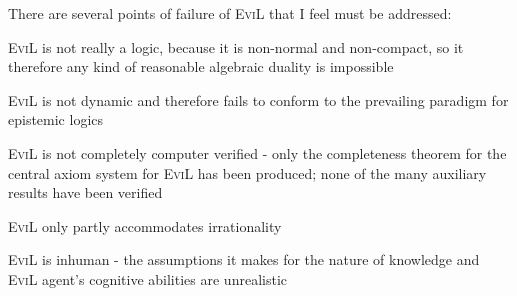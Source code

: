 There are several points of failure of \textsc{EviL} that I feel must be
addressed:
\begin{myRoman}
  \item \textsc{EviL} is not really a logic, because it is non-normal
    and non-compact, so it therefore any kind of reasonable algebraic
    duality is impossible \citep[for details on this, see][chapter 5]{blackburn_modal_2001} 
  \item \textsc{EviL} is not dynamic and therefore fails to conform to
    the prevailing paradigm for epistemic logics
    \item \textsc{EviL} is not completely computer verified - only the
      completeness theorem for the central axiom system for
      \textsc{EviL} has been produced; none of the many auxiliary
      results have been verified
    \item \textsc{EviL} only partly accommodates irrationality
    \item \textsc{EviL} is inhuman - the assumptions it makes for the
      nature of knowledge and \textsc{EviL} agent's cognitive
      abilities are unrealistic
\end{myRoman}